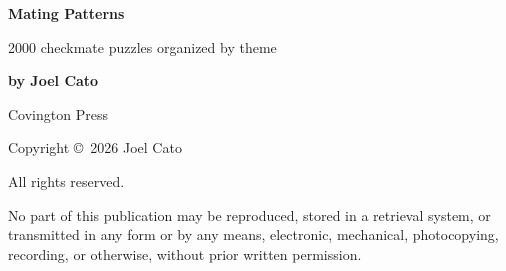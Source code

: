 \documentclass[12pt,twoside]{article}
\begin{document}

\thispagestyle{empty}

\vspace*{0.16\textheight}

\begin{center}
{\Huge\bfseries Mating Patterns\par}
\vspace{1.8em}
\begin{minipage}{0.82\textwidth}
\centering
\large 2000 checkmate puzzles organized by theme\par
\end{minipage}
\end{center}

\vspace*{0.14\textheight}

\begin{center}
\begin{minipage}{0.52\textwidth}
\centering
{\LARGE\bfseries by Joel Cato\par}
\end{minipage}
\end{center}

\vfill

\begin{center}
{\normalsize Covington Press\par}
\end{center}

\newpage

\thispagestyle{empty}

\vspace*{0.72\textheight}

\begin{center}
\small
Copyright \copyright\ 2026 Joel Cato

All rights reserved.

No part of this publication may be reproduced, stored in a retrieval system,
or transmitted in any form or by any means, electronic, mechanical,
photocopying, recording, or otherwise, without prior written permission.
\end{center}

\newpage


\thispagestyle{empty}

\vspace*{0.05\textheight}
\end{document}
